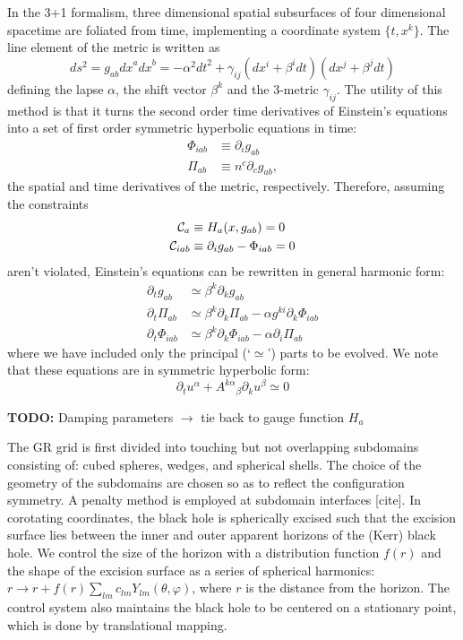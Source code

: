 In the 3+1 formalism, three dimensional spatial subsurfaces of four dimensional spacetime are foliated from time, implementing a coordinate system $\{t, x^k\}$.  The line element of the metric is written as
\begin{equation}
ds^2 = g_{ab} {dx}^a {dx}^b = -\alpha^2 {dt}^2 + \gamma_{ij} (dx^i + \beta^i dt) (dx^j + \beta^j dt)
\end{equation} 
defining the lapse $\alpha$, the shift vector $\beta^k$ and the 3-metric $\gamma_{ij}$. 
The utility of this method is that it turns the second order time derivatives of Einstein's equations into a set of first order symmetric hyperbolic equations in time:
\begin{align}
\Phi_{iab} &\equiv \partial_i g_{ab} \\
\Pi_{ab} &\equiv n^c \partial_c g_{ab},
\end{align}
the spatial and time derivatives of the metric, respectively.  
Therefore, assuming the constraints
\begin{align}
{\cal{C}}_a &\equiv H_a (x, g_{ab} ) = 0 \\
{\cal{C}}_{iab} &\equiv \partial_i g_{ab} - \Phi_{iab} = 0
\end{align}
aren't violated, Einstein's equations can be rewritten in general harmonic form:
\begin{align}
\partial_t g_{ab} &\simeq \beta^k \partial_k g_{ab} \\
\partial_t \Pi_{ab} &\simeq \beta^k \partial_k \Pi_{ab} - \alpha g^{ki} \partial_k \Phi_{iab} \\
\partial_t \Phi_{iab} &\simeq \beta^k \partial_k \Phi_{iab} - \alpha  \partial_i \Pi_{ab}
\end{align}
where we have included only the principal (`$\simeq$') parts to be evolved.  We note that these equations are in symmetric hyperbolic form:
\begin{equation}
\partial_t u^\alpha + {A^{k\alpha}}_\beta \partial_k u^\beta \simeq 0
\end{equation}

\textbf{TODO:} Damping parameters $\rightarrow$ tie back to gauge function $H_a$

The GR grid is first divided into touching but not overlapping subdomains consisting of: cubed spheres, wedges, and spherical shells.  The choice of the geometry of the subdomains are chosen so as to reflect the configuration symmetry.  A penalty method is employed at subdomain interfaces [cite].  In corotating coordinates, the black hole is spherically excised such that the excision surface lies between the inner and outer apparent horizons of the (Kerr) black hole.  We control the size of the horizon with a distribution function $f(r)$ and the shape of the excision surface as a series of spherical harmonics: $r \rightarrow r + f(r) \sum_{lm} { c_{lm} Y_{lm}(\theta, \varphi) }$, where $r$ is the distance from the horizon.  The control system also maintains the black hole to be centered on a stationary point, which is done by translational mapping.  

